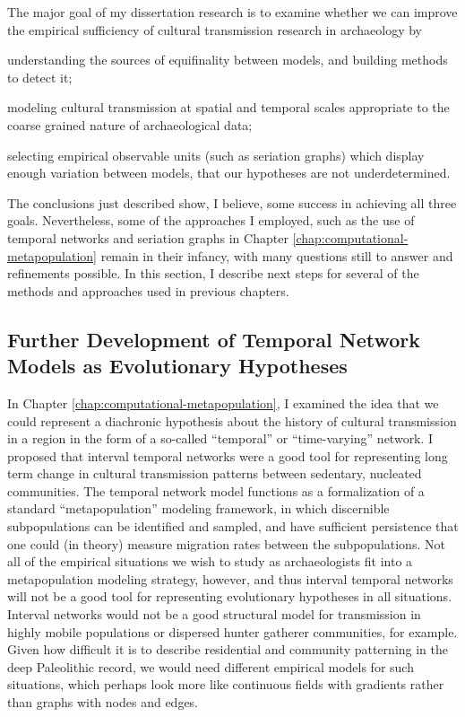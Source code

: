 The major goal of my dissertation research is to examine whether we can improve the empirical sufficiency of cultural transmission research in archaeology by \begin{dissparalist}
\item understanding the sources of equifinality between models, and building methods to detect it;
\item modeling cultural transmission at spatial and temporal scales appropriate to the coarse grained nature of archaeological data;
\item selecting empirical observable units (such as seriation graphs) which display enough variation between models, that our hypotheses are not underdetermined.
\end{dissparalist}  The conclusions just described show, I believe, some success in achieving all three goals.  Nevertheless, some of the approaches I employed, such as the use of temporal networks and seriation graphs in Chapter \ref{chap:computational-metapopulation} remain in their infancy, with many questions still to answer and refinements possible.  In this section, I describe next steps for several of the methods and approaches used in previous chapters. 

\subsection{Further Development of Temporal Network Models as Evolutionary Hypotheses}\label{conc:sec:future-temporal-networks}

In Chapter \ref{chap:computational-metapopulation}, I examined the idea that we could represent a diachronic hypothesis about the history of cultural transmission in a region in the form of a so-called ``temporal'' or ``time-varying'' network.   
I proposed that interval temporal networks were a good tool for representing long term change in cultural transmission patterns between sedentary, nucleated communities.  The temporal network model functions as a formalization of a standard ``metapopulation'' modeling framework, in which discernible subpopulations can be identified and sampled, and have sufficient persistence that one could (in theory) measure migration rates between the subpopulations.  Not all of the empirical situations we wish to study as archaeologists fit into a metapopulation modeling strategy, however, and thus interval temporal networks will not be a good tool for representing evolutionary hypotheses in all situations.  Interval networks would not be a good structural model for transmission in highly mobile populations or dispersed hunter gatherer communities, for example.  Given how difficult it is to describe residential and community patterning in the deep Paleolithic record, we would need different empirical models for such situations, which perhaps look more like continuous fields with gradients rather than graphs with nodes and edges. 

